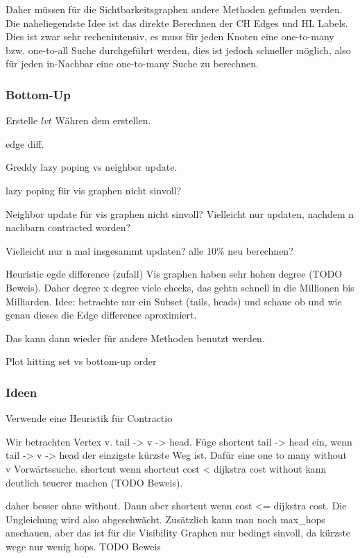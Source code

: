 Daher müssen für die Sichtbarkeitsgraphen andere Methoden gefunden werden.
Die naheliegendste Idee ist das direkte Berechnen der CH Edges und HL Labels.
Dies ist zwar sehr rechenintensiv, es muss für jeden Knoten eine one-to-many bzw. one-to-all Suche durchgeführt werden, dies ist jedoch schneller möglich, also für jeden in-Nachbar eine one-to-many Suche zu berechnen.


\subsubsection{Bottom-Up}

Erstelle $lvt$ Währen dem erstellen.

edge diff.

Greddy lazy poping vs neighbor update.

lazy poping für vis graphen nicht sinvoll?

Neighbor update für vis graphen nicht sinvoll?
Vielleicht nur updaten, nachdem n nachbarn contracted worden?

Vielleicht nur n mal insgesammt updaten? alle 10\% neu berechnen?



Heuristic egde difference (zufall)
Vis graphen haben sehr hohen degree (TODO Beweis).
Daher degree x degree viele checks, das gehtn schnell in die Millionen bis Milliarden.
Idee: betrachte nur ein Subset (tails, heads) und schaue ob und wie genau dieses die Edge difference aproximiert.

Das kann dann wieder für andere Methoden benutzt werden.

Plot hitting set vs bottom-up order


\subsubsection{Ideen}

Verwende eine Heuristik für Contractio


Wir betrachten Vertex v. tail -> v -> head.
Füge shortcut tail -> head ein, wenn tail -> v -> head der einzigste kürzste Weg ist.
Dafür eine one to many without v Vorwärtssuche.
shortcut wenn shortcut cost < dijkstra cost
without kann deutlich teuerer machen (TODO Beweis).

daher besser ohne without. Dann aber shortcut wenn cost <= dijkstra cost.
Die Ungleichung wird also abgeschwächt.
Zusätzlich kann man noch max\_hops anschauen, aber das ist für die Visibility Graphen nur bedingt sinvoll, da kürzste wege nur wenig hops. TODO Beweis

